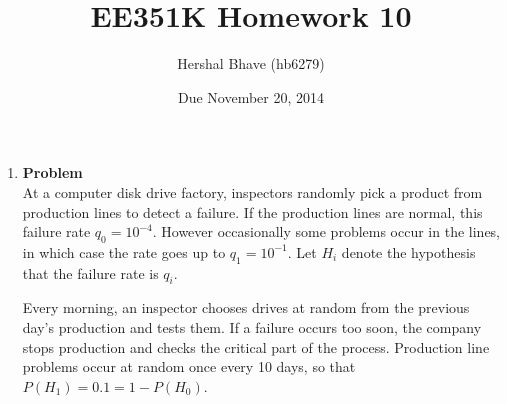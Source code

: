 \documentclass[12pt]{article}
\title{EE351K Homework 10}
\author{Hershal Bhave (hb6279)}
\date{Due November 20, 2014}
\newenvironment{Ex}{\textbf{Problem}\vspace{.75em}\\}{}
\begin{document}
\maketitle
\begin{enumerate}
\item
  \begin{Ex}
    At a computer disk drive factory, inspectors randomly pick a
    product from production lines to detect a failure. If the
    production lines are normal, this failure rate $q_0 =
    10^{-4}$. However occasionally some problems occur in the lines,
    in which case the rate goes up to $q_1 = 10^{-1}$. Let $H_i$
    denote the hypothesis that the failure rate is $q_i$.
    
    Every morning, an inspector chooses drives at random from the
    previous day’s production and tests them. If a failure occurs too
    soon, the company stops production and checks the critical part of
    the process. Production line problems occur at random once every
    10 days, so that $P(H_1) = 0.1 = 1 - P(H_0)$.  


\end{Ex}
\end{enumerate}
\end{document}
